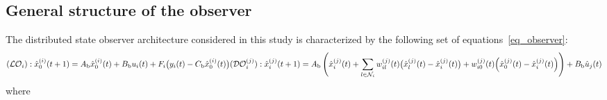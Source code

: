 \subsection{General structure of the observer}
\vspace*{-0.2cm}
The distributed state observer architecture considered in this study is characterized by the following set of equations~\eqref{eq_observer}:
\begin{subequations}\label{eq_observer}
\begin{small}
\begin{equation}\label{eq_LO}
(\LO_i): \hat{x}_{0}^{(i)}(t+1) = A_{\text{b}} \hat{x}_{0}^{(i)}(t) + B_{\text{b}} u_i(t)
+ F_i\big(y_i(t) - C_{\text{b}} \hat{x}_{0}^{(i)}(t)\big) %
\end{equation}
\begin{equation}\label{eq_DO}
(\DO_i^{(j)}): \hat{x}^{(j)}_i(t+1) = A_{\text{b}}\left( \hat{x}_i^{(j)}(t)  + \sum_{l \in \mathcal{N}_i} w_{i l}^{(j)}(t)
   \big(\hat{x}_l^{(j)}(t)-\hat{x}_i^{(j)}(t)\big) +  w_{i 0}^{(j)}(t)
   \Big(\hat{x}_0^{(j)}(t)-\hat{x}_i^{(j)}(t)\Big) \right) + B_{\text{b}} \hat{u}_j(t)%
\end{equation}
\end{small}
\end{subequations}
where 
